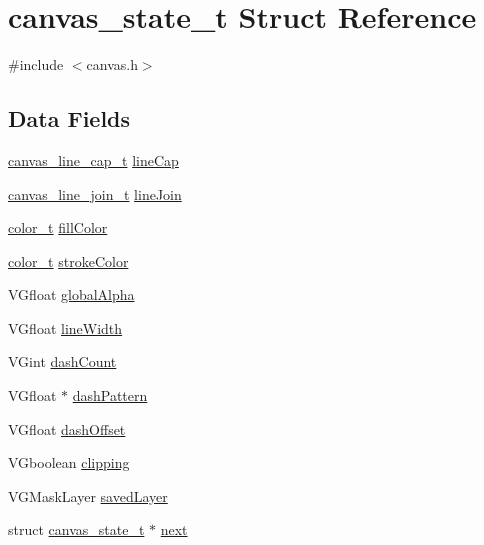 \hypertarget{structcanvas__state__t}{}\section{canvas\+\_\+state\+\_\+t Struct Reference}
\label{structcanvas__state__t}


{\ttfamily \#include $<$canvas.\+h$>$}

\subsection*{Data Fields}
\begin{DoxyCompactItemize}
\item 
\hyperlink{canvas_8h_a6f28313f30bb2c28992e9e35a89d5f37}{canvas\+\_\+line\+\_\+cap\+\_\+t} \hyperlink{structcanvas__state__t_ab8a525903afc565a43bc8a0dfe75b866}{line\+Cap}
\item 
\hyperlink{canvas_8h_a565fe2807948893e6f97695409abd0b0}{canvas\+\_\+line\+\_\+join\+\_\+t} \hyperlink{structcanvas__state__t_adf0f976e5ae4b1b864216b96e9b4aafd}{line\+Join}
\item 
\hyperlink{structcolor__t}{color\+\_\+t} \hyperlink{structcanvas__state__t_a11e41bb683196e0f3fe94b3ec03eb84e}{fill\+Color}
\item 
\hyperlink{structcolor__t}{color\+\_\+t} \hyperlink{structcanvas__state__t_af12f76ebfaaba2fd2aca008b5771a7a8}{stroke\+Color}
\item 
V\+Gfloat \hyperlink{structcanvas__state__t_a95d523b1df5a121a83039f320d456328}{global\+Alpha}
\item 
V\+Gfloat \hyperlink{structcanvas__state__t_a96a2ac5de66c17fa2c411d38543ff310}{line\+Width}
\item 
V\+Gint \hyperlink{structcanvas__state__t_af816a480213b5d7fcab1b53204c4a4d5}{dash\+Count}
\item 
V\+Gfloat $\ast$ \hyperlink{structcanvas__state__t_a853b1185b6a5f5066aab0442cebfad4d}{dash\+Pattern}
\item 
V\+Gfloat \hyperlink{structcanvas__state__t_af97cf4ada992ba2eeff89ded6974b94b}{dash\+Offset}
\item 
V\+Gboolean \hyperlink{structcanvas__state__t_aeed448020ed8ed0206c897522ea62f29}{clipping}
\item 
V\+G\+Mask\+Layer \hyperlink{structcanvas__state__t_a46394e3d2c0bfac283b820478a8e54e6}{saved\+Layer}
\item 
struct \hyperlink{structcanvas__state__t}{canvas\+\_\+state\+\_\+t} $\ast$ \hyperlink{structcanvas__state__t_affd976ea64b3c8ac9ee660b20e8be5a9}{next}
\end{DoxyCompactItemize}


